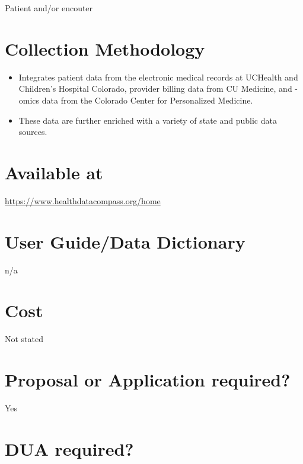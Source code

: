 \documentclass[
]{book}
\providecommand{\tightlist}{%
  \setlength{\itemsep}{0pt}\setlength{\parskip}{0pt}}
\begin{document}
Patient and/or encouter

\hypertarget{collection-methodology-30}{%
\section{Collection Methodology}\label{collection-methodology-30}}

\begin{itemize}
\tightlist
\item
  Integrates patient data from the electronic medical records at UCHealth and Children's Hospital Colorado, provider billing data from CU Medicine, and -omics data from the Colorado Center for Personalized Medicine.
\item
  These data are further enriched with a variety of state and public data sources.
\end{itemize}

\hypertarget{available-at-30}{%
\section{Available at}\label{available-at-30}}

\url{https://www.healthdatacompass.org/home}

\hypertarget{user-guidedata-dictionary-30}{%
\section{User Guide/Data Dictionary}\label{user-guidedata-dictionary-30}}

n/a

\hypertarget{cost-30}{%
\section{Cost}\label{cost-30}}

Not stated

\hypertarget{proposal-or-application-required-30}{%
\section{Proposal or Application required?}\label{proposal-or-application-required-30}}

Yes

\hypertarget{dua-required-30}{%
\section{DUA required?}\label{dua-required-30}}
\end{document}
